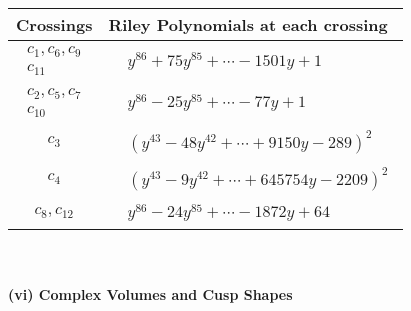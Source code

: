 \documentclass[1p]{elsarticle_modified}
\theoremstyle{definition}
\begin{document}
\begin{tabular}{m{50pt}|m{274pt}}
Crossings & \hspace{64pt}Riley Polynomials at each crossing \\
\hline $$\begin{aligned}c_{1},c_{6},c_{9}\\c_{11}\end{aligned}$$&$\begin{aligned}
&y^{86}+75 y^{85}+\cdots-1501 y+1
\end{aligned}$\\
\hline $$\begin{aligned}c_{2},c_{5},c_{7}\\c_{10}\end{aligned}$$&$\begin{aligned}
&y^{86}-25 y^{85}+\cdots-77 y+1
\end{aligned}$\\
\hline $$\begin{aligned}c_{3}\end{aligned}$$&$\begin{aligned}
&(y^{43}-48 y^{42}+\cdots+9150 y-289)^{2}
\end{aligned}$\\
\hline $$\begin{aligned}c_{4}\end{aligned}$$&$\begin{aligned}
&(y^{43}-9 y^{42}+\cdots+645754 y-2209)^{2}
\end{aligned}$\\
\hline $$\begin{aligned}c_{8},c_{12}\end{aligned}$$&$\begin{aligned}
&y^{86}-24 y^{85}+\cdots-1872 y+64
\end{aligned}$\\
\hline
\end{tabular}\\~\\
\newpage\flushleft \textbf{(vi) Complex Volumes and Cusp Shapes}
\end{document}
